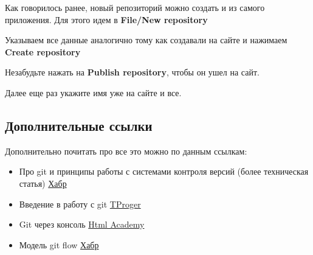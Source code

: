 \documentclass[11pt]{article}
\providecommand{\tightlist}{%
      \setlength{\itemsep}{0pt}\setlength{\parskip}{0pt}}
\begin{document}
Как говорилось ранее, новый репозиторий можно создать и из самого
приложения. Для этого идем в \textbf{File/New repository}

Указываем все данные аналогично тому как создавали на сайте и нажимаем
\textbf{Create repository}

Незабудьте нажать на \textbf{Publish repository}, чтобы он ушел на сайт.

Далее еще раз укажите имя уже на сайте и все.

    \subsection{Дополнительные
ссылки}\label{ux434ux43eux43fux43eux43bux43dux438ux442ux435ux43bux44cux43dux44bux435-ux441ux441ux44bux43bux43aux438}

Дополнительно почитать про все это можно по данным ссылкам:

\begin{itemize}
\tightlist
\item
  Про git и принципы работы с системами контроля версий (более
  техническая статья) \href{https://habr.com/ru/post/440816/}{Хабр}
\item
  Введение в работу с git
  \href{https://tproger.ru/translations/beginner-git-cheatsheet/}{TProger}
\item
  Git через консоль
  \href{https://htmlacademy.ru/blog/useful/git/git-console}{Html
  Academy}
\item
  Модель git flow \href{https://habr.com/ru/post/106912/}{Хабр}
\end{itemize}


    
    
    
    
\end{document}
